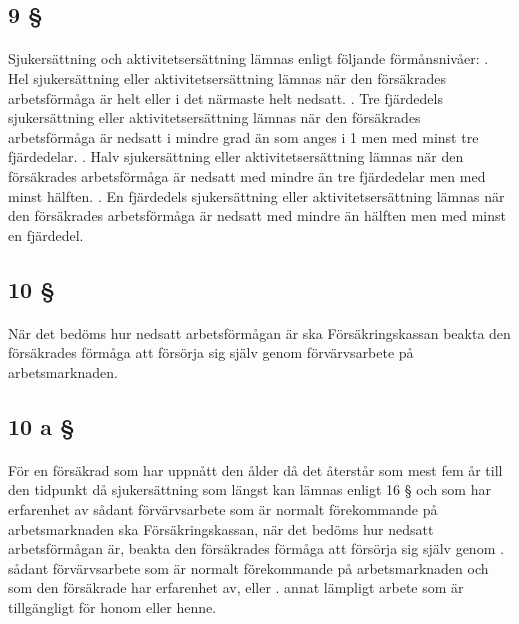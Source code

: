 \documentclass[a4paper,notitlepage,openany,10pt]{book}
\begin{document}
\subsection*{9 §}
\paragraph*{}
Sjukersättning och aktivitetsersättning lämnas enligt följande förmånsnivåer:
. Hel sjukersättning eller aktivitetsersättning lämnas när den försäkrades arbetsförmåga är helt eller i det närmaste helt nedsatt.
. Tre fjärdedels sjukersättning eller aktivitetsersättning lämnas när den försäkrades arbetsförmåga är nedsatt i mindre grad än som anges i 1 men med minst tre fjärdedelar.
. Halv sjukersättning eller aktivitetsersättning lämnas när den försäkrades arbetsförmåga är nedsatt med mindre än tre fjärdedelar men med minst hälften.
. En fjärdedels sjukersättning eller aktivitetsersättning lämnas när den försäkrades arbetsförmåga är nedsatt med mindre än hälften men med minst en fjärdedel.
\subsection*{10 §}
\paragraph*{}
När det bedöms hur nedsatt arbetsförmågan är ska Försäkringskassan beakta den försäkrades förmåga att försörja sig själv genom förvärvsarbete på arbetsmarknaden.
\subsection*{10 a §}
\paragraph*{}
För en försäkrad som har uppnått den ålder då det återstår som mest fem år till den tidpunkt då sjukersättning som längst kan lämnas enligt 16 § och som har erfarenhet av sådant förvärvsarbete som är normalt förekommande på arbetsmarknaden ska Försäkringskassan, när det bedöms hur nedsatt arbetsförmågan är, beakta den försäkrades förmåga att försörja sig själv genom
. sådant förvärvsarbete som är normalt förekommande på arbetsmarknaden och som den försäkrade har erfarenhet av, eller
. annat lämpligt arbete som är tillgängligt för honom eller henne.
\end{document}
